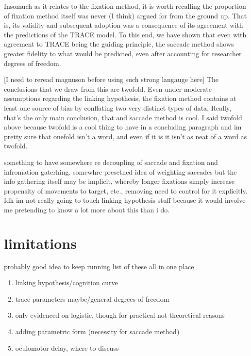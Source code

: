 \documentclass{article}
\begin{document}
Insomuch as it relates to the fixation method, it is worth recalling the proportion of fixation method itself was never (I think) argued for from the ground up. That is, its validity and subsequent adoption was a consequence of its agreement with the predictions of the TRACE model. To this end, we have shown that even with agreement to TRACE being the guiding principle, the saccade method shows greater fidelity to what would be predicted, even after accounting for researcher degrees of freedom.

[I need to reread magnuson before using such strong langauge here]
The conclusions that we draw from this are twofold. Even under moderate assumptions regarding the linking hypothesis, the fixation method contains at least one source of bias by conflating two very distinct types of data. Really, that's the only main conclusion, that and saccade method is cool. I said twofold above because twofold is a cool thing to have in a concluding paragraph and im pretty sure that onefold isn't a word, and even if it is it isn't as neat of a word as twofold.

something to have somewhere re decoupling of saccade and fixation and infromation gaterhing. somewhre presetned idea of weighting saccades but the info gathering itself may be implicit, whereby longer fixations simply increase propensity of movements to target, etc., removing need to control for it explicitly. Idk im not really going to touch linking hypothesis stuff because it would involve me pretending to know a lot more about this than i do.


\section{limitations}

probably good idea to keep running list of these all in one place

\begin{enumerate}
\item linking hypothesis/cognition curve
\item trace parameters maybe/general degrees of freedom
\item only evidenced on logistic, though for practical not theoretical reasons
\item adding parametric form (necessity for saccade method)
\item oculomotor delay, where to discuss
\end{enumerate}

\end{document}
